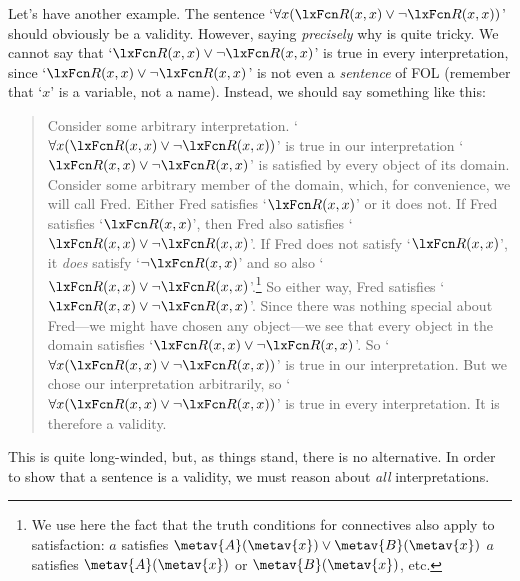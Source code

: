 Let's have another example. The sentence `$\forall x(\atom{R}{x,x}\eor\enot \atom{R}{x,x})$' should obviously be a validity. However, saying \emph{precisely} why is quite tricky. We cannot say that `$\atom{R}{x,x} \eor\enot \atom{R}{x,x}$' is true in every interpretation, since `$\atom{R}{x,x} \eor\enot \atom{R}{x,x}$' is not even a \emph{sentence} of FOL (remember that `$x$' is a variable, not a name). Instead, we should say something like this:
	\begin{quote}
		Consider some arbitrary interpretation. `$\forall x(\atom{R}{x,x}\eor \enot\atom{R}{x,x})$' is true in our interpretation \ifeff{} `$\atom{R}{x,x}\eor\enot\atom{R}{x,x}$' is satisfied by every object of its domain. Consider some arbitrary member of the domain, which, for convenience, we will call Fred. Either Fred satisfies `$\atom{R}{x,x}$' or it does not. If Fred satisfies `$\atom{R}{x,x}$', then Fred also satisfies `$\atom{R}{x,x} \eor \enot \atom{R}{x,x}$'. If Fred does not satisfy `$\atom{R}{x,x}$', it \emph{does} satisfy `$\enot\atom{R}{x,x}$' and so also `$\atom{R}{x,x} \eor\enot \atom{R}{x,x}$'.\footnote{We use here the fact that the truth conditions for connectives also apply to satisfaction: $a$ satisfies $\metav{A}(\metav{x}) \lor \metav{B}(\metav{x})$ \ifeff{} $a$ satisfies $\metav{A}(\metav{x})$ or $\metav{B}(\metav{x})$, etc.} So either way, Fred satisfies `$\atom{R}{x,x} \eor\enot \atom{R}{x,x}$'. Since there was nothing special about Fred---we might have chosen any object---we see that every object in the domain satisfies `$\atom{R}{x,x} \eor\enot \atom{R}{x,x}$'. So `$\forall x (\atom{R}{x,x} \eor\enot \atom{R}{x,x})$' is true in our interpretation. But we chose our interpretation arbitrarily, so `$\forall x (\atom{R}{x,x} \eor\enot \atom{R}{x,x})$' is true in every interpretation. It is therefore a validity.
	\end{quote}
This is quite long-winded, but, as things stand, there is no alternative. In order to show that a sentence is a validity, we must reason about \emph{all} interpretations.

